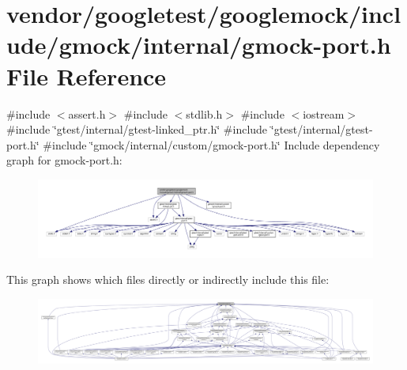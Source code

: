 \hypertarget{gmock-port_8h}{}\section{vendor/googletest/googlemock/include/gmock/internal/gmock-\/port.h File Reference}
\label{gmock-port_8h}
{\ttfamily \#include $<$assert.\+h$>$}\newline
{\ttfamily \#include $<$stdlib.\+h$>$}\newline
{\ttfamily \#include $<$iostream$>$}\newline
{\ttfamily \#include \char`\"{}gtest/internal/gtest-\/linked\+\_\+ptr.\+h\char`\"{}}\newline
{\ttfamily \#include \char`\"{}gtest/internal/gtest-\/port.\+h\char`\"{}}\newline
{\ttfamily \#include \char`\"{}gmock/internal/custom/gmock-\/port.\+h\char`\"{}}\newline
Include dependency graph for gmock-\/port.h\+:
\nopagebreak
\begin{figure}[H]
\begin{center}
\leavevmode
\includegraphics[width=350pt]{gmock-port_8h__incl}
\end{center}
\end{figure}
This graph shows which files directly or indirectly include this file\+:
\nopagebreak
\begin{figure}[H]
\begin{center}
\leavevmode
\includegraphics[width=350pt]{gmock-port_8h__dep__incl}
\end{center}
\end{figure}

